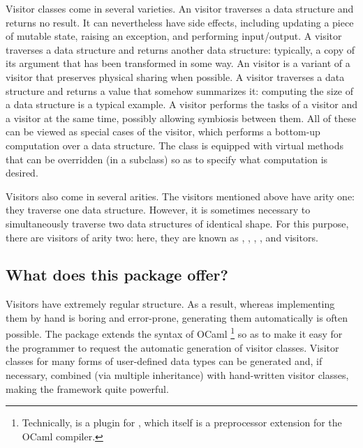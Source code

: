 \documentclass[11pt,a4paper,twoside]{article}
\begin{document}
Visitor classes come in several varieties. An \iter visitor traverses a data
structure and returns no result. It can nevertheless have side effects,
including updating a piece of mutable state, raising an exception, and
performing input/output. A \map visitor traverses a data structure and returns
another data structure: typically, a copy of its argument that has been
transformed in some way. An \mapendo visitor is a variant of a \map visitor
that preserves physical sharing when possible. A \reduce visitor traverses a
data structure and returns a value that somehow summarizes it: computing the
size of a data structure is a typical example. A \mapreduce visitor performs
the tasks of a \map visitor and a \reduce visitor at the same time,
possibly allowing symbiosis between them. All of these can be viewed as
special cases of the \fold visitor, which performs a bottom-up computation
over a data structure. The class \fold is equipped with virtual methods
that can be overridden (in a subclass) so as to specify what computation is
desired.

Visitors also come in several arities. The visitors mentioned above have arity
one: they traverse one data structure. However, it is sometimes necessary to
simultaneously traverse two data structures of identical shape. For this
purpose, there are visitors of arity two: here, they are known as \itertwo,
\maptwo, \reducetwo, \mapreducetwo, and \foldtwo visitors.



\subsection{What does this package offer?}

Visitors have extremely regular structure. As a result, whereas implementing
them by hand is boring and error-prone, generating them automatically is often
possible. The \visitors package extends the syntax of OCaml%
%
\footnote{Technically, \visitors is a plugin for \ppxderiving, which itself is
  a preprocessor extension for the OCaml compiler.}
%
so as to make it easy for the programmer to request the automatic generation
of visitor classes. Visitor classes for many forms of user-defined data types
can be generated and, if necessary, combined (via multiple inheritance) with
hand-written visitor classes, making the framework quite powerful.
\end{document}
